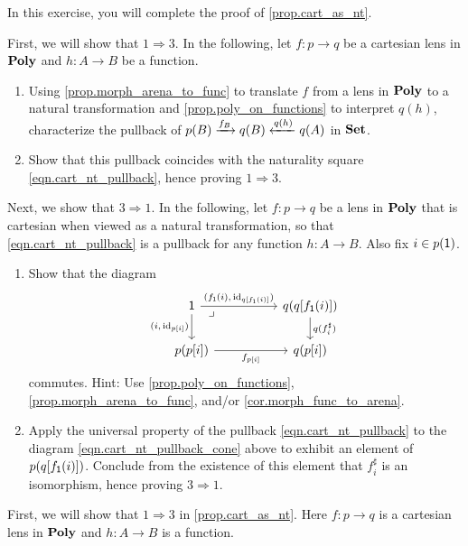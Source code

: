 \documentclass[Book-Poly]{subfiles}
\begin{document}
\begin{exercise} \label{exc.cart_as_nt}
In this exercise, you will complete the proof of \cref{prop.cart_as_nt}.

First, we will show that $1\Rightarrow3$.
In the following, let $f\colon p\to q$ be a cartesian lens in $\mathbf{Poly}$ and $h\colon A\to B$ be a function.
\begin{enumerate}
    \item Using \cref{prop.morph_arena_to_func} to translate $f$ from a lens in $\mathbf{Poly}$ to a natural transformation and \cref{prop.poly_on_functions} to interpret $q(h)$, characterize the pullback of $p(B)\xrightarrow{f_B}q(B)\xleftarrow{q(h)}q(A)$ in $\mathbf{Set}$.
    \item Show that this pullback coincides with the naturality square \eqref{eqn.cart_nt_pullback}, hence proving $1\Rightarrow3$.
\end{enumerate}
Next, we show that $3\Rightarrow1$.
In the following, let $f\colon p\to q$ be a lens in $\mathbf{Poly}$ that is cartesian when viewed as a natural transformation, so that \eqref{eqn.cart_nt_pullback} is a pullback for any function $h\colon A\to B$.
Also fix $i\in p(\textsf{1})$.
\begin{enumerate}[resume]
    \item Show that the diagram
    \begin{equation} \label{eqn.cart_nt_pullback_cone}
        \begin{tikzcd}[column sep=50pt]
        	\1 \ar[r, "{(f_\1(i),\,\id_{q[f_\1(i)]})}"]\ar[d, "{(i,\,\id_{p[i]})}"']&
        	q(q[f_\1(i)])\ar[d, "q(f^\sharp_i)"]\\
        	p(p[i])\ar[r, "f_{p[i]}"']&
        	q(p[i])\ar[ul, phantom, very near end, "\lrcorner"]
        \end{tikzcd}
    \end{equation}
    commutes.
    Hint: Use \cref{prop.poly_on_functions}, \cref{prop.morph_arena_to_func}, and/or \cref{cor.morph_func_to_arena}.
    \item Apply the universal property of the pullback \eqref{eqn.cart_nt_pullback} to the diagram \eqref{eqn.cart_nt_pullback_cone} above to exhibit an element of $p(q[f_{\textsf{1}}(i)])$.
    Conclude from the existence of this element that $f^\sharp_i$ is an isomorphism, hence proving $3\Rightarrow1$.\qedhere
\end{enumerate}
\begin{solution}
First, we will show that $1\Rightarrow3$ in \cref{prop.cart_as_nt}.
Here $f\colon p\to q$ is a cartesian lens in $\mathbf{Poly}$ and $h\colon A\to B$ is a function.

\end{solution}
\end{exercise}
\end{document}

